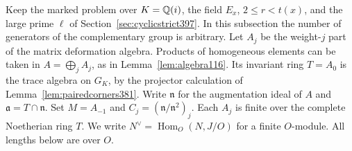 \documentclass[a4paper,11pt]{article}
\theoremstyle{definition}
\theoremstyle{remark}
\numberwithin{equation}{section}
\begin{document}
Keep the marked problem over \(K=\mathbb Q(i)\), the field \(E_x\),
\(2\le r<t(x)\), and the large prime \(\ell\) of
Section~\ref{sec:cyclicstrict397}. In this subsection the number of
generators of the complementary group is arbitrary. Let \(A_j\) be
the weight-\(j\) part of the matrix deformation algebra. Products
of homogeneous elements can be taken in \(A=\bigoplus_j A_j\),
as in Lemma~\ref{lem:algebra116}. Its invariant ring \(T=A_0\)
is the trace algebra on \(G_K\), by the projector calculation of
Lemma~\ref{lem:pairedcorners381}. Write \(\mathfrak n\) for the
augmentation ideal of \(A\) and \(\mathfrak a=T\cap\mathfrak n\).
Set \(M=A_{-1}\) and \(C_j=(\mathfrak n/\mathfrak n^2)_j\).
Each \(A_j\) is finite over the complete Noetherian ring \(T\).
We write \(N^\vee=\operatorname{Hom}_O(N,J/O)\) for a finite
\(O\)-module. All lengths below are over \(O\).
\end{document}
